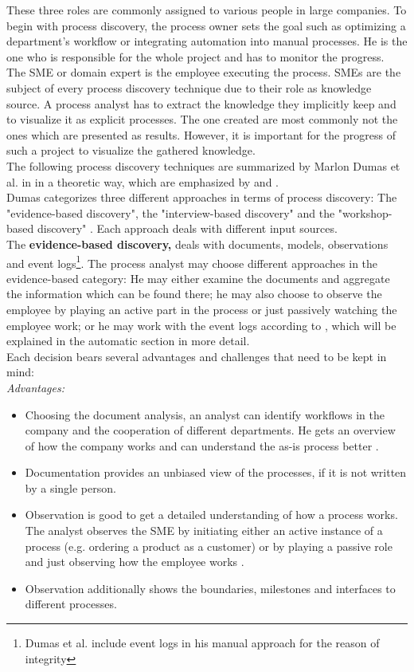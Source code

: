 These three roles are commonly assigned to various people in large companies. To begin with process discovery, the process owner sets the goal such as optimizing a department's workflow or integrating automation into manual processes. He is the one who is responsible for the whole project and has to monitor the progress. \\
The SME or domain expert is the employee executing the process. SMEs are the subject of every process discovery technique due to their role as knowledge source. A process analyst has to extract the knowledge they implicitly keep and to visualize it as explicit processes. The one created are most commonly not the ones which are presented as results. However, it is important for the progress of such a project to visualize the gathered knowledge. \\
The following process discovery techniques are summarized by Marlon Dumas et al. in \cite{Dumas2013} in a theoretic way, which are emphasized by \cite{Verner2004} and \cite{Jadhav2011}. \\
Dumas categorizes three different approaches in terms of process discovery: The "evidence-based discovery", the "interview-based discovery" and the "workshop-based discovery" \cite{Dumas2013}. Each approach deals with different input sources. \\
The \textbf{evidence-based discovery,} deals with documents, models, observations and event logs\footnote{Dumas et al. include event logs in his manual approach for the reason of integrity}. The process analyst may choose different approaches in the evidence-based category: He may either examine the documents and aggregate the information which can be found there; he may also choose to observe the employee by playing an active part in the process or just passively watching the employee work; or he may work with the event logs according to \cite{Dumas2013}, which will be explained in the automatic section in more detail. \\
Each decision bears several advantages and challenges that need to be kept in mind: \\


\textit{Advantages:}
\begin{itemize}
\item Choosing the document analysis, an analyst can identify workflows in the company and the cooperation of different departments. He gets an overview of how the company works and can understand the as-is process better \cite{Dumas2013}. 
\item Documentation provides an unbiased view of the processes, if it is not written by a single person. 
\item Observation is good to get a detailed understanding of how a process works. The analyst observes the SME by initiating either an active instance of a process (e.g. ordering a product as a customer) or by playing a passive role and just observing how the employee works \cite{Dumas2013}. 
\item Observation additionally shows the boundaries, milestones and interfaces to different processes.
\end{itemize}

